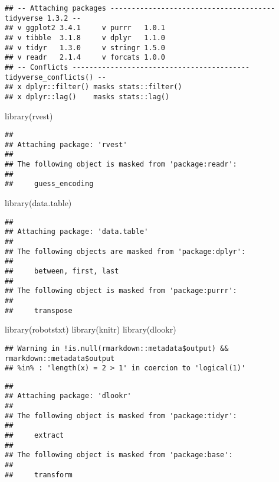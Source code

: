 \documentclass[
]{article}
\newenvironment{Shaded}{\begin{snugshade}}{\end{snugshade}}
\newcommand{\FunctionTok}[1]{\textcolor[rgb]{0.00,0.00,0.00}{#1}}
\newcommand{\NormalTok}[1]{#1}
\begin{document}
\begin{verbatim}
## -- Attaching packages --------------------------------------- tidyverse 1.3.2 --
## v ggplot2 3.4.1     v purrr   1.0.1
## v tibble  3.1.8     v dplyr   1.1.0
## v tidyr   1.3.0     v stringr 1.5.0
## v readr   2.1.4     v forcats 1.0.0
## -- Conflicts ------------------------------------------ tidyverse_conflicts() --
## x dplyr::filter() masks stats::filter()
## x dplyr::lag()    masks stats::lag()
\end{verbatim}

\begin{Shaded}
\begin{Highlighting}[]
\FunctionTok{library}\NormalTok{(rvest)}
\end{Highlighting}
\end{Shaded}

\begin{verbatim}
## 
## Attaching package: 'rvest'
## 
## The following object is masked from 'package:readr':
## 
##     guess_encoding
\end{verbatim}

\begin{Shaded}
\begin{Highlighting}[]
\FunctionTok{library}\NormalTok{(data.table)}
\end{Highlighting}
\end{Shaded}

\begin{verbatim}
## 
## Attaching package: 'data.table'
## 
## The following objects are masked from 'package:dplyr':
## 
##     between, first, last
## 
## The following object is masked from 'package:purrr':
## 
##     transpose
\end{verbatim}

\begin{Shaded}
\begin{Highlighting}[]
\FunctionTok{library}\NormalTok{(robotstxt)}
\FunctionTok{library}\NormalTok{(knitr)}
\FunctionTok{library}\NormalTok{(dlookr)}
\end{Highlighting}
\end{Shaded}

\begin{verbatim}
## Warning in !is.null(rmarkdown::metadata$output) && rmarkdown::metadata$output
## %in% : 'length(x) = 2 > 1' in coercion to 'logical(1)'
\end{verbatim}

\begin{verbatim}
## 
## Attaching package: 'dlookr'
## 
## The following object is masked from 'package:tidyr':
## 
##     extract
## 
## The following object is masked from 'package:base':
## 
##     transform
\end{verbatim}
\end{document}
